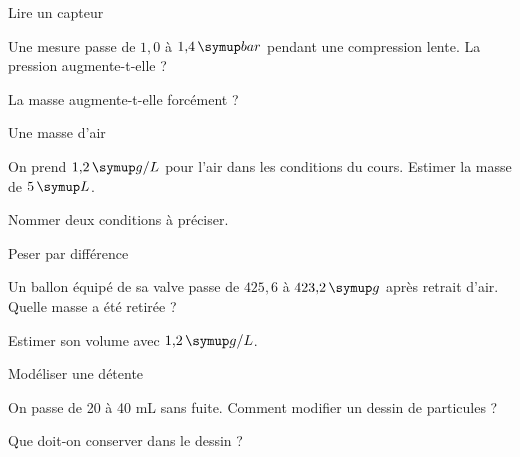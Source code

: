 \par\noindent\begin{minipage}{\linewidth}
\begin{exercice}[2]{Lire un capteur}
\begin{questions}
\item Une mesure passe de $1{,}0$ à $1{,}4\unite{bar}$ pendant une compression lente. La pression augmente-t-elle ?
\item La masse augmente-t-elle forcément ?
\end{questions}
\end{exercice}
\end{minipage}
\par\noindent\begin{minipage}{\linewidth}
\begin{exercice}[2]{Une masse d’air}
\begin{questions}
\item On prend $1{,}2\unite{g/L}$ pour l’air dans les conditions du cours. Estimer la masse de $5\unite L$.
\item Nommer deux conditions à préciser.
\end{questions}
\end{exercice}
\end{minipage}
\par\noindent\begin{minipage}{\linewidth}
\begin{exercice}[2]{Peser par différence}
\begin{questions}
\item Un ballon équipé de sa valve passe de $425{,}6$ à $423{,}2\unite g$ après retrait d’air. Quelle masse a été retirée ?
\item Estimer son volume avec $1{,}2\unite{g/L}$.
\end{questions}
\end{exercice}
\end{minipage}
\par\noindent\begin{minipage}{\linewidth}
\begin{exercice}[2]{Modéliser une détente}
\begin{questions}
\item On passe de 20 à 40 mL sans fuite. Comment modifier un dessin de particules ?
\item Que doit-on conserver dans le dessin ?
\end{questions}
\end{exercice}
\end{minipage}
